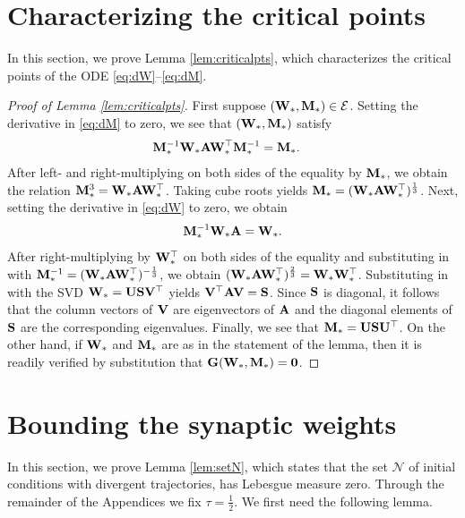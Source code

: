 \documentclass[11pt]{article}
\theoremstyle{definition}
\newcommand{\inv}{^{-1}}
\newcommand{\A}{{\bf A}}
\newcommand{\G}{{\bf G}}
\newcommand{\M}{{\bf M}}
\renewcommand{\S}{{\bf S}}
\newcommand{\U}{{\bf U}}
\newcommand{\V}{{\bf V}}
\newcommand{\W}{{\bf W}}
\newcommand{\calE}{\mathcal{E}}
\newcommand{\calN}{\mathcal{N}}
\begin{document}
\section{Characterizing the critical points}\label{apdx:criticalpts}

In this section, we prove Lemma \ref{lem:criticalpts}, which characterizes the critical points of the ODE \eqref{eq:dW}--\eqref{eq:dM}.

\begin{proof}[Proof of Lemma \ref{lem:criticalpts}]
    First suppose $(\W_\ast,\M_\ast)\in\calE$. 
    Setting the derivative in \eqref{eq:dM} to zero, we see that $(\W_\ast,\M_\ast)$ satisfy
    \begin{align*}
        \M_\ast\inv\W_\ast\A\W_\ast^\top\M_\ast\inv&=\M_\ast.
    \end{align*}
    After left- and right-multiplying on both sides of the equality by $\M_\ast$, we obtain the relation $\M_\ast^3=\W_\ast\A\W_\ast^\top$.
    Taking cube roots yields $\M_\ast=(\W_\ast\A\W_\ast^\top)^{\frac13}$.
    Next, setting the derivative in \eqref{eq:dW} to zero, we obtain
    \begin{align*}
        \M_\ast\inv\W_\ast\A=\W_\ast.
    \end{align*}
    After right-multiplying by $\W_\ast^\top$ on both sides of the equality and substituting in with $\M_\ast\inv=(\W_\ast\A\W_\ast^\top)^{-\frac13}$, we obtain $(\W_\ast\A\W_\ast^\top)^{\frac23}=\W_\ast\W_\ast^\top$.
    Substituting in with the SVD $\W_\ast=\U\S\V^\top$ yields $\V^\top\A\V=\S$. Since $\S$ is diagonal, it follows that the column vectors of $\V$ are eigenvectors of $\A$ and the diagonal elements of $\S$ are the corresponding eigenvalues. Finally, we see that $\M_\ast=\U\S\U^\top$. On the other hand, if $\W_\ast$ and $\M_\ast$ are as in the statement of the lemma, then it is readily verified by substitution that $\G(\W_\ast,\M_\ast)={\bf 0}$.
\end{proof}

\section{Bounding the synaptic weights}\label{apdx:setN}

In this section, we prove Lemma \ref{lem:setN}, which states that the set $\calN$ of initial conditions with divergent trajectories, has Lebesgue measure zero. 
Through the remainder of the Appendices we fix $\tau=\tfrac12$.
We first need the following lemma.
\end{document}
